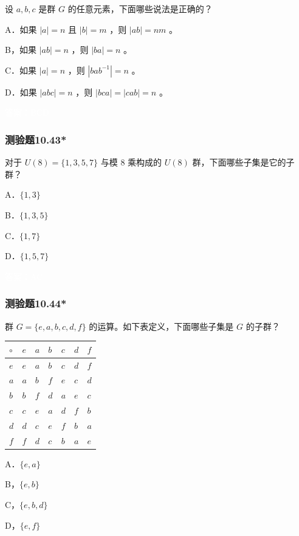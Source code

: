 \documentclass[UTF8, heading=true]{ctexart}
\begin{document}
设 $a, b, c$ 是群 $G$ 的任意元素，下面哪些说法是正确的？

A．如果 $|a|=n$ 且 $|b|=m$ ，则 $|a b|=n m$ 。

B，如果 $|a b|=n$ ，则 $|b a|=n$ 。

C．如果 $|a|=n$ ，则 $\left|b a b^{-1}\right|=n$ 。

D．如果 $|a b c|=n$ ，则 $|b c a|=|c a b|=n$ 。


\textcolor{white}{答案：BCD}

\subsubsection{测验题10.43*}

对于 $U(8)=\{1,3,5,7\}$ 与模 8 乘构成的 $U(8)$ 群，下面哪些子集是它的子群？

A．$\{1,3\}$

B．$\{1,3,5\}$

C．$\{1,7\}$

D．$\{1,5,7\}$

\textcolor{white}{答案：AC}

\subsubsection{测验题10.44*}

群 $G=\{e, a, b, c, d, f\}$ 的运算。如下表定义，下面哪些子集是 $G$ 的子群？
\begin{table}[H]
  \renewcommand{\arraystretch}{1.5}
  \centering
\begin{tabular}{l|llllll}
\hline$\circ$ & $e$ & $a$ & $b$ & $c$ & $d$ & $f$ \\
\hline$e$ & $e$ & $a$ & $b$ & $c$ & $d$ & $f$ \\
$a$ & $a$ & $b$ & $f$ & $e$ & $c$ & $d$ \\
$b$ & $b$ & $f$ & $d$ & $a$ & $e$ & $c$ \\
$c$ & $c$ & $e$ & $a$ & $d$ & $f$ & $b$ \\
$d$ & $d$ & $c$ & $e$ & $f$ & $b$ & $a$ \\
$f$ & $f$ & $d$ & $c$ & $b$ & $a$ & $e$ \\
\hline
\end{tabular}
\end{table}

A．$\{e, a\}$

B，$\{e, b\}$

C，$\{e, b, d\}$

D，$\{e, f\}$
\end{document}
